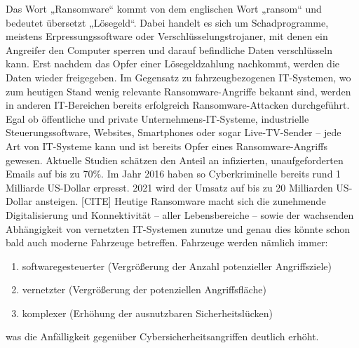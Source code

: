 Das Wort „Ransomware“ kommt von dem englischen Wort „ransom“ und 
bedeutet übersetzt „Lösegeld“. Dabei handelt es sich um Schadprogramme, 
meistens Erpressungssoftware oder Verschlüsselungstrojaner, mit denen ein 
Angreifer den Computer sperren und darauf befindliche Daten verschlüsseln 
kann. Erst nachdem das Opfer einer Lösegeldzahlung nachkommt, werden die 
Daten wieder freigegeben. 
\newline
Im Gegensatz zu fahrzeugbezogenen IT-Systemen, wo zum heutigen Stand wenig 
relevante Ransomware-Angriffe bekannt sind, werden in anderen IT-Bereichen 
bereits erfolgreich Ransomware-Attacken durchgeführt. Egal ob öffentliche und 
private Unternehmens-IT-Systeme, industrielle Steuerungssoftware, Websites, 
Smartphones oder sogar Live-TV-Sender – jede Art von IT-Systeme kann und ist 
bereits Opfer eines Ransomware-Angriffs gewesen. 
\newline
Aktuelle Studien schätzen den Anteil an infizierten, unaufgeforderten Emails auf 
bis zu 70$\%$. Im Jahr 2016 haben so Cyberkriminelle bereits rund 1 Milliarde US-Dollar 
erpresst. 2021 wird der Umsatz auf bis zu 20 Milliarden US-Dollar ansteigen. [CITE] 
\newline
Heutige Ransomware macht sich die zunehmende Digitalisierung und Konnektivität – aller 
Lebensbereiche – sowie der wachsenden Abhängigkeit von vernetzten IT-Systemen zunutze
und genau dies könnte schon bald auch moderne Fahrzeuge betreffen. 
Fahrzeuge werden nämlich immer:

\begin{enumerate}
    \item softwaregesteuerter (Vergrößerung der Anzahl potenzieller Angriffsziele)
    \item vernetzter (Vergrößerung der potenziellen Angriffsfläche)
    \item komplexer (Erhöhung der ausnutzbaren Sicherheitslücken)
\end{enumerate}
was die Anfälligkeit gegenüber Cybersicherheitsangriffen deutlich erhöht. 

